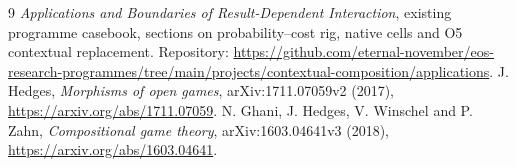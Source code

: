 \documentclass[11pt]{article}
\begin{document}
\begin{thebibliography}{9}
 \emph{Applications and Boundaries of Result-Dependent Interaction}, existing programme casebook, sections on probability--cost rig, native cells and O5 contextual replacement. Repository: \url{https://github.com/eternal-november/eos-research-programmes/tree/main/projects/contextual-composition/applications}.
 J. Hedges, \emph{Morphisms of open games}, arXiv:1711.07059v2 (2017), \url{https://arxiv.org/abs/1711.07059}.
 N. Ghani, J. Hedges, V. Winschel and P. Zahn, \emph{Compositional game theory}, arXiv:1603.04641v3 (2018), \url{https://arxiv.org/abs/1603.04641}.
\end{thebibliography}
\end{document}
